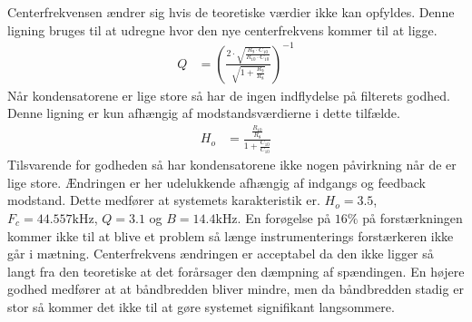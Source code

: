 Centerfrekvensen ændrer sig hvis de teoretiske værdier ikke kan opfyldes. Denne ligning bruges til at udregne hvor den nye centerfrekvens kommer til at ligge.
\begin{align}
	Q & = \left( \frac{2 \cdot \sqrt{\frac{R_9 \cdot C_{10}}{R_{10} \cdot C_{10}}}}{\sqrt{1+\frac{R_9}{R_8}}} \right)^{-1}
	\end{align}
Når kondensatorene er lige store så har de ingen indflydelse på filterets godhed. Denne ligning er kun afhængig af modstandsværdierne i dette tilfælde.
\begin{align}
	H_o & = \frac{\frac{R_{10}}{R_8}}{1+\frac{C_{10}}{C_{10}}}
\end{align}
Tilsvarende for godheden så har kondensatorene ikke nogen påvirkning når de er lige store.
Ændringen er her udelukkende afhængig af indgangs og feedback modstand.
Dette medfører at systemets karakteristik er. 
$H_o = 3.5$, $F_c = 44.557 \si{\kilo\hertz}$, $Q = 3.1$ og $B = 14.4 \si{\kilo\hertz}$. 
En forøgelse på $16 \%$ på forstærkningen kommer ikke til at blive et problem så længe instrumenterings forstærkeren ikke går i mætning. 
Centerfrekvens ændringen er acceptabel da den ikke ligger så langt fra den teoretiske at det forårsager den dæmpning af spændingen.
En højere godhed medfører at at båndbredden bliver mindre, men da båndbredden stadig er stor så kommer det ikke til at gøre systemet signifikant langsommere.
